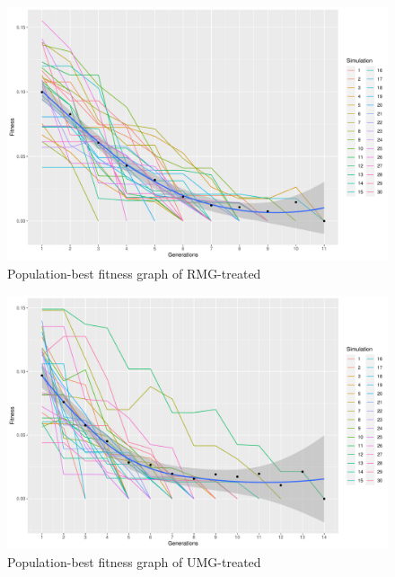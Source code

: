 \documentclass{strrespaper-trad}
\begin{document}
		\begin{figure}[htbp]
			\centering
			\includegraphics[width=\textwidth]{../figures/rmg_ftrack}
			\caption{Population-best fitness graph of RMG-treated}
			\label{fig:fitgraph_rmg}
		\end{figure}
		\begin{figure}[htbp]
			\centering
			\includegraphics[width=\textwidth]{../figures/umg_ftrack}
			\caption{Population-best fitness graph of UMG-treated}
			\label{fig:fitgraph_umg}
		\end{figure}
\end{document}
